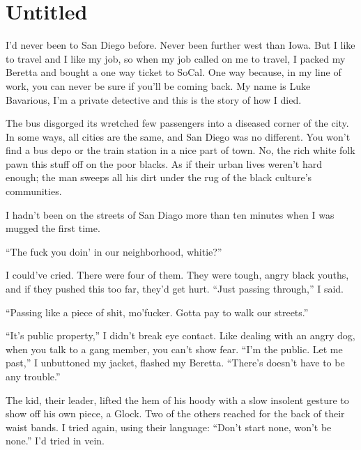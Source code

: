 \chapter{Untitled}


I'd never been to San Diego before. Never been further west
than Iowa. But I like to travel and I like my job, so when my job
called on me to travel, I packed my Beretta and bought a one way
ticket to SoCal. One way because, in my line of work, you can never
be sure if you'll be coming back. My name is Luke Bavarious,
I'm a private detective and this is the story of how I died.



The bus disgorged its wretched few passengers into a diseased
corner of the city. In some ways, all cities are the same, and San
Diego was no different. You won't find a bus depo or the
train station in a nice part of town. No, the rich white folk pawn
this stuff off on the poor blacks. As if their urban lives
weren't hard enough; the man sweeps all his dirt under the
rug of the black culture's communities.



I hadn't been on the streets of San Diago more than ten
minutes when I was mugged the first time.



``The fuck you doin' in our neighborhood,
whitie?''



I could've cried. There were four of them. They were tough,
angry black youths, and if they pushed this too far, they'd
get hurt. ``Just passing through,'' I said.



``Passing like a piece of shit, mo'fucker. Gotta pay to
walk our streets.''



``It's public property,'' I didn't break eye
contact. Like dealing with an angry dog, when you talk to a gang
member, you can't show fear. ``I'm the public. Let
me past,'' I unbuttoned my jacket, flashed my Beretta.
``There's doesn't have to be any
trouble.''



The kid, their leader, lifted the hem of his hoody with a slow
insolent gesture to show off his own piece, a Glock. Two of the
others reached for the back of their waist bands. I tried again,
using their language: ``Don't start none, won't be
none.'' I'd tried in vein.




